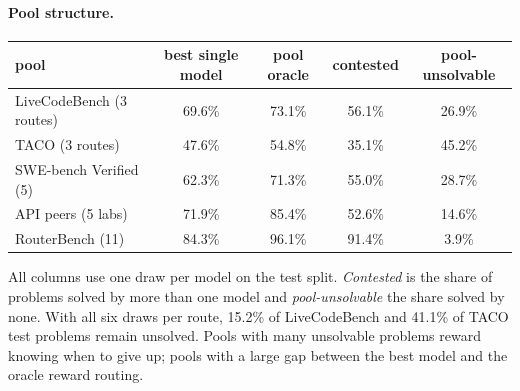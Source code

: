 \documentclass[10pt]{article} %
\begin{document}
\paragraph{Pool structure.}
\label{sec:poolstructure}
\begin{center}
\small
\begin{tabular}{lcccc}
\toprule
pool & best single model & pool oracle & contested & pool-unsolvable \\
\midrule
LiveCodeBench (3 routes) & 69.6\% & 73.1\% & 56.1\% & 26.9\% \\
TACO (3 routes) & 47.6\% & 54.8\% & 35.1\% & 45.2\% \\
SWE-bench Verified (5) & 62.3\% & 71.3\% & 55.0\% & 28.7\% \\
API peers (5 labs) & 71.9\% & 85.4\% & 52.6\% & 14.6\% \\
RouterBench (11) & 84.3\% & 96.1\% & 91.4\% & 3.9\% \\
\bottomrule
\end{tabular}
\end{center}
All columns use one draw per model on the test split.  \emph{Contested} is the share of problems
solved by more than one model and \emph{pool-unsolvable} the share solved by none.  With all six
draws per route, 15.2\% of LiveCodeBench and 41.1\% of TACO test problems remain unsolved.  Pools
with many unsolvable problems reward knowing when to give up; pools with a large gap between the
best model and the oracle reward routing.
\end{document}
